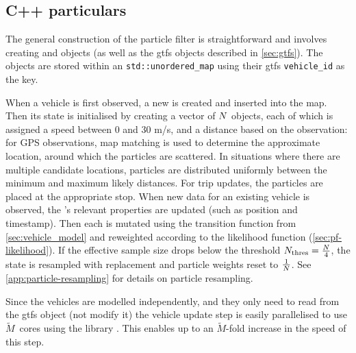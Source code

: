 \subsection{C++ particulars}
\label{sec:pf_implementation}

The general construction of the particle filter is straightforward and involves creating  and  objects (as well as the \gls{gtfs} objects described in \cref{sec:gtfs}). The  objects are stored within an \verb+std::unordered_map+ using their \gls{gtfs} \verb+vehicle_id+ as the key.

When a vehicle is first observed, a new  is created and inserted into the map. Then its state is initialised by creating a vector of $N$  objects, each of which is assigned a speed between 0 and 30 m/s, and a distance based on the observation: for GPS observations, map matching is used to determine the approximate location, around which the particles are scattered. In situations where there are multiple candidate locations, particles are distributed uniformly between the minimum and maximum likely distances. For trip updates, the particles are placed at the appropriate stop. When new data for an existing vehicle is observed, the 's relevant properties are updated (such as position and timestamp). Then each  is mutated using the transition function from \cref{sec:vehicle_model} and reweighted according to the likelihood function (\cref{sec:pf-likelihood}). If the effective sample size drops below the threshold $N_\text{thres}=\frac{N}{4}$, the state is resampled with replacement and particle weights reset to $\frac{1}{N}$. See \cref{app:particle-resampling} for details on particle resampling.

Since the vehicles are modelled independently, and they only need to read from the \gls{gtfs} object (not modify it) the vehicle update step is easily parallelised to use $\tilde M$~cores using the  library \citep{OMP}. This enables up to an $\tilde M$-fold increase in the speed of this step.

